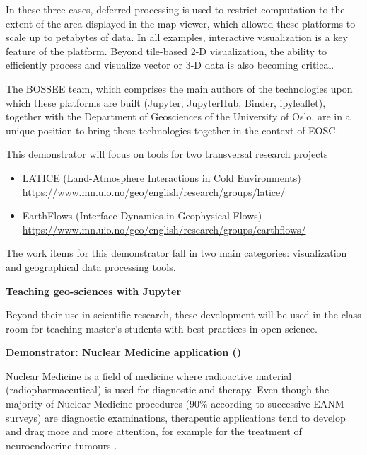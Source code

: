 In these three cases, deferred processing is used to restrict computation to
the extent of the area displayed in the map viewer, which allowed these
platforms to scale up to petabytes of data. In all examples, interactive
visualization is a key feature of the platform. Beyond tile-based
2-D visualization, the ability to efficiently process and visualize vector
or 3-D  data is also becoming critical.

The BOSSEE team, which comprises the main authors of the technologies upon
which these platforms are built (Jupyter, JupyterHub, Binder, ipyleaflet),
together with the Department of Geosciences of the University of Oslo, are
in a unique position to bring these technologies together in the context of
EOSC.

This demonstrator will focus on tools for two transversal research projects

\begin{itemize}
\item LATICE (Land-Atmosphere Interactions in Cold Environments)
\url{https://www.mn.uio.no/geo/english/research/groups/latice/}
\item EarthFlows (Interface Dynamics in Geophysical Flows)
\url{https://www.mn.uio.no/geo/english/research/groups/earthflows/}
\end{itemize}

The work items for this demonstrator fall in two main categories:
visualization and geographical data processing tools.

\textbf{Teaching geo-sciences with Jupyter}

Beyond their use in scientific research, these development will be used in
the class room for teaching master's students with best practices in open
science.


\medskip
\textbf{Demonstrator: Nuclear Medicine application ()}\label{sec:concept-demonstrators-opendose}

  Nuclear Medicine is a field of medicine where radioactive material
  (radiopharmaceutical) is used for diagnostic and therapy. Even though the
  majority of Nuclear Medicine procedures (90\% according to successive EANM
  surveys) are diagnostic examinations, therapeutic applications tend to
  develop and drag more and more attention, for example for the treatment of
  neuroendocrine tumours \cite{Bodei2009}.

